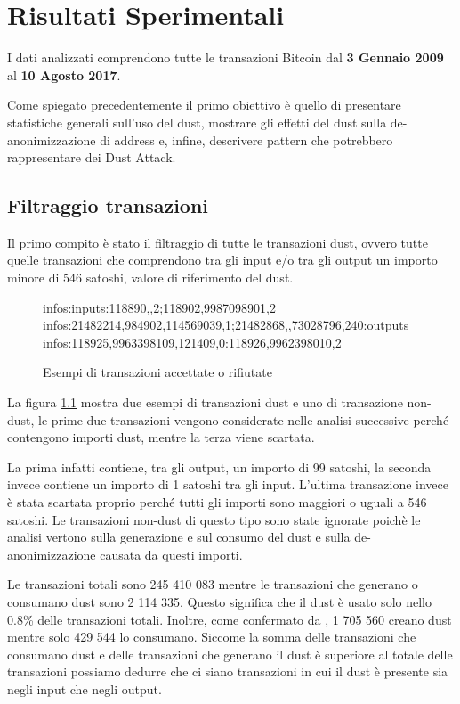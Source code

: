 \chapter{Risultati Sperimentali}
\captionsetup[table]{name=Tabella}
I dati analizzati comprendono tutte le transazioni Bitcoin dal \textbf{3 Gennaio 2009} al \textbf{10 Agosto 2017}.

Come spiegato precedentemente il primo obiettivo è quello di presentare statistiche generali sull'uso del dust, mostrare gli effetti del dust sulla de-anonimizzazione di address e, infine, descrivere pattern che potrebbero rappresentare dei Dust Attack.

\section{Filtraggio transazioni}
Il primo compito è stato il filtraggio di tutte le transazioni dust, ovvero tutte quelle transazioni che comprendono tra gli input e/o tra gli output un importo minore di 546 satoshi, valore di riferimento del dust.
\begin{figure}[H]
\begin{mdframed}
 infos:inputs:118890,,2;118902,9987098901,2 \checkmark\\
 infos:21482214,984902,114569039,1;21482868,,73028796,240:outputs \checkmark\\
 infos:118925,9963398109,121409,0:118926,9962398010,2 
\end{mdframed}
\caption{Esempi di transazioni accettate o rifiutate}
\label{tx_dust}
\end{figure}
\Floatbarrier
La figura \ref{tx_dust} mostra due esempi di transazioni dust e uno di transazione non-dust, le prime due transazioni vengono considerate nelle analisi successive perché contengono importi dust, mentre la terza viene scartata. 

La prima infatti contiene, tra gli output, un importo di 99 satoshi, la seconda invece contiene un importo di 1 satoshi tra gli input. L'ultima transazione invece è stata scartata proprio perché tutti gli importi sono maggiori o uguali a 546 satoshi. Le transazioni non-dust di questo tipo sono state ignorate poichè le analisi vertono sulla generazione e sul consumo del dust e sulla de-anonimizzazione causata da questi importi.

Le transazioni totali sono 245 410 083 mentre le transazioni che generano o consumano dust sono  2 114 335. Questo significa che il dust è usato solo nello 0.8\% delle transazioni totali. Inoltre, come confermato da \cite{dustAnalisi}, 1 705 560 creano dust mentre solo 429 544 lo consumano. Siccome la somma delle transazioni che consumano dust e delle transazioni che generano il dust è superiore al totale delle transazioni possiamo dedurre che ci siano transazioni in cui il dust è presente sia negli input che negli output.

